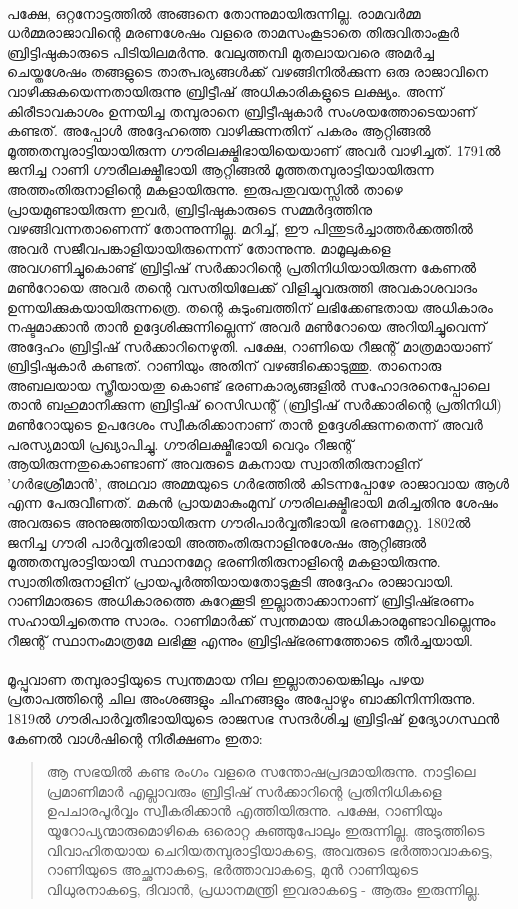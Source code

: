 \paragraph{}പക്ഷേ, ഒറ്റനോട്ടത്തിൽ അങ്ങനെ തോന്നുമായിരുന്നില്ല. രാമവർമ്മ ധർമ്മരാജാവിന്റെ മരണശേഷം വളരെ താമസംകൂടാതെ തിരുവിതാംകൂർ ബ്രിട്ടിഷുകാരുടെ പിടിയിലമർന്നു. വേലുത്തമ്പി മുതലായവരെ അമർച്ച ചെയ്തശേഷം തങ്ങളുടെ താത്പര്യങ്ങൾക്ക് വഴങ്ങിനിൽക്കുന്ന ഒരു രാജാവിനെ വാഴിക്കുകയെന്നതായിരുന്നു ബ്രിട്ടീഷ് അധികാരികളുടെ ലക്ഷ്യം. അന്ന് കിരീടാവകാശം ഉന്നയിച്ച തമ്പുരാനെ ബ്രിട്ടീഷുകാർ സംശയത്തോടെയാണ് കണ്ടത്. അപ്പോൾ അദ്ദേഹത്തെ വാഴിക്കുന്നതിന് പകരം ആറ്റിങ്ങൽ മൂത്തതമ്പുരാട്ടിയായിരുന്ന ഗൗരിലക്ഷ്മിഭായിയെയാണ് അവർ വാഴിച്ചത്. 1791ൽ ജനിച്ച റാണി ഗൗരീലക്ഷ്മീഭായി ആറ്റിങ്ങൽ മൂത്തതമ്പുരാട്ടിയായിരുന്ന അത്തംതിരുനാളിന്റെ മകളായിരുന്നു. ഇരുപതുവയസ്സിൽ താഴെ പ്രായമുണ്ടായിരുന്ന ഇവർ, ബ്രിട്ടിഷുകാരുടെ സമ്മർദ്ദത്തിനു വഴങ്ങിവന്നതാണെന്ന് തോന്നുന്നില്ല. മറിച്ച്, ഈ പിന്തുടർച്ചാത്തർക്കത്തിൽ അവർ സജീവപങ്കാളിയായിരുന്നെന്ന് തോന്നുന്നു. മാമൂലുകളെ അവഗണിച്ചുകൊണ്ട് ബ്രിട്ടിഷ് സർക്കാറിന്റെ പ്രതിനിധിയായിരുന്ന കേണൽ മൺറോയെ അവർ തന്റെ വസതിയിലേക്ക് വിളിച്ചുവരുത്തി അവകാശവാദം ഉന്നയിക്കുകയായിരുന്നത്രെ. തന്റെ കുടുംബത്തിന് ലഭിക്കേണ്ടതായ അധികാരം നഷ്ടമാക്കാൻ താൻ ഉദ്ദേശിക്കുന്നില്ലെന്ന് അവർ മൺറോയെ അറിയിച്ചുവെന്ന് അദ്ദേഹം ബ്രിട്ടിഷ് സർക്കാറിനെഴുതി. പക്ഷേ, റാണിയെ റീജന്റ് മാത്രമായാണ് ബ്രിട്ടിഷുകാർ കണ്ടത്. റാണിയും അതിന് വഴങ്ങിക്കൊടുത്തു. താനൊരു അബലയായ സ്ത്രീയായതു കൊണ്ട് ഭരണകാര്യങ്ങളിൽ സഹോദരനെപ്പോലെ താൻ ബഹുമാനിക്കുന്ന ബ്രിട്ടിഷ് റെസിഡന്റ് (ബ്രിട്ടിഷ് സർക്കാരിന്റെ പ്രതിനിധി) മൺറോയുടെ ഉപദേശം സ്വീകരിക്കാനാണ് താൻ ഉദ്ദേശിക്കുന്നതെന്ന് അവർ പരസ്യമായി പ്രഖ്യാപിച്ചു. ഗൗരിലക്ഷ്മീഭായി വെറും റീജന്റ് ആയിരുന്നതുകൊണ്ടാണ് അവരുടെ മകനായ സ്വാതിതിരുനാളിന് 'ഗർഭശ്രീമാൻ', അഥവാ അമ്മയുടെ ഗർഭത്തിൽ കിടന്നപ്പോഴേ രാജാവായ ആൾ എന്ന പേരുവീണത്. മകൻ പ്രായമാകുംമുമ്പ് ഗൗരിലക്ഷ്മീഭായി മരിച്ചതിനു ശേഷം അവരുടെ അനുജത്തിയായിരുന്ന ഗൗരിപാർവ്വതീഭായി ഭരണമേറ്റു. 1802ൽ ജനിച്ച ഗൗരി പാർവ്വതിഭായി അത്തംതിരുനാളിനുശേഷം ആറ്റിങ്ങൽ മൂത്തതമ്പുരാട്ടിയായി സ്ഥാനമേറ്റ ഭരണിതിരുനാളിന്റെ മകളായിരുന്നു. സ്വാതിതിരുനാളിന് പ്രായപൂർത്തിയായതോടുകൂടി അദ്ദേഹം രാജാവായി. റാണിമാരുടെ അധികാരത്തെ കുറേക്കൂടി ഇല്ലാതാക്കാനാണ് ബ്രിട്ടിഷ്ഭരണം സഹായിച്ചതെന്നു സാരം. റാണിമാർക്ക് സ്വന്തമായ അധികാരമുണ്ടാവില്ലെന്നും റീജന്റ് സ്ഥാനംമാത്രമേ ലഭിക്കൂ എന്നും ബ്രിട്ടിഷ്ഭരണത്തോടെ തീർച്ചയായി.

\paragraph{}മൂപ്പുവാണ തമ്പുരാട്ടിയുടെ സ്വന്തമായ നില ഇല്ലാതായെങ്കിലും പഴയ പ്രതാപത്തിന്റെ ചില അംശങ്ങളും ചിഹ്നങ്ങളും അപ്പോഴും ബാക്കിനിന്നിരുന്നു. 1819ൽ ഗൗരിപാർവ്വതീഭായിയുടെ രാജസഭ സന്ദർശിച്ച ബ്രിട്ടിഷ് ഉദ്യോഗസ്ഥൻ കേണൽ വാൾഷിന്റെ നിരീക്ഷണം ഇതാ:
\begin{quotation}
\noindent ആ സഭയിൽ കണ്ട രംഗം വളരെ സന്തോഷപ്രദമായിരുന്നു. നാട്ടിലെ പ്രമാണിമാർ എല്ലാവരും ബ്രിട്ടിഷ് സർക്കാറിന്റെ പ്രതിനിധികളെ ഉപചാരപൂർവ്വം സ്വീകരിക്കാൻ എത്തിയിരുന്നു. പക്ഷേ, റാണിയും യൂറോപ്യന്മാരുമൊഴികെ ഒരൊറ്റ കുഞ്ഞുപോലും ഇരുന്നില്ല. അടുത്തിടെ വിവാഹിതയായ ചെറിയതമ്പുരാട്ടിയാകട്ടെ, അവരുടെ ഭർത്താവാകട്ടെ, റാണിയുടെ അച്ഛനാകട്ടെ, ഭർത്താവാകട്ടെ, മുൻ റാണിയുടെ വിധുരനാകട്ടെ, ദിവാൻ, പ്രധാനമന്ത്രി ഇവരാകട്ടെ - ആരും ഇരുന്നില്ല.
\end{quotation}

